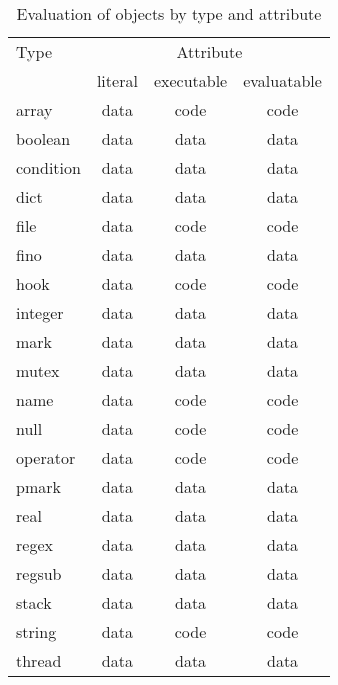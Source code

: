 \begin{table}[htb]
\begin{center}
\begin{tabular}{|l|c|c|c|}
\hline
Type		& \multicolumn{3}{|c|}{Attribute}	\\
\cline{2-4}
		& literal & executable & evaluatable	\\
\hline \hline
array		& data	& code	& code	\\
\hline
boolean		& data	& data	& data	\\
\hline
condition	& data	& data	& data	\\
\hline
dict		& data	& data	& data	\\
\hline
file		& data	& code	& code	\\
\hline
fino		& data	& data	& data	\\
\hline
hook		& data	& code	& code	\\
\hline
integer		& data	& data	& data	\\
\hline
mark		& data	& data	& data	\\
\hline
mutex		& data	& data	& data	\\
\hline
name		& data	& code	& code	\\
\hline
null		& data	& code	& code	\\
\hline
operator	& data	& code	& code	\\
\hline
pmark		& data	& data	& data	\\
\hline
real		& data	& data	& data	\\
\hline
regex		& data	& data	& data	\\
\hline
regsub		& data	& data	& data	\\
\hline
stack		& data	& data	& data	\\
\hline
string		& data	& code	& code	\\
\hline
thread		& data	& data	& data	\\
\hline
\end{tabular}
\end{center}
\caption{\label{eval-act}
Evaluation of objects by type and attribute}
\end{table}

